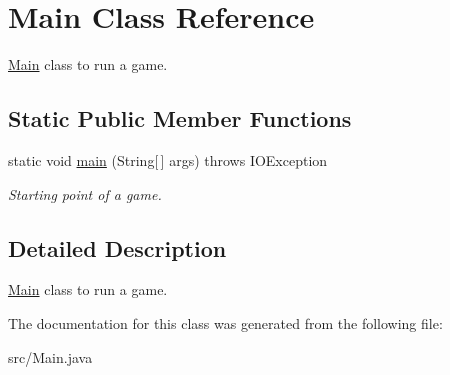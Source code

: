 \hypertarget{classMain}{}\section{Main Class Reference}
\label{classMain}


\hyperlink{classMain}{Main} class to run a game.  


\subsection*{Static Public Member Functions}
\begin{DoxyCompactItemize}
\item 
static void \hyperlink{classMain_a8a5d0f827edddff706cc0e6740d0579a}{main} (String\mbox{[}$\,$\mbox{]} args)  throws I\+O\+Exception \hypertarget{classMain_a8a5d0f827edddff706cc0e6740d0579a}{}\label{classMain_a8a5d0f827edddff706cc0e6740d0579a}

\begin{DoxyCompactList}\small\item\em Starting point of a game. \end{DoxyCompactList}\end{DoxyCompactItemize}


\subsection{Detailed Description}
\hyperlink{classMain}{Main} class to run a game. 

The documentation for this class was generated from the following file\+:\begin{DoxyCompactItemize}
\item 
src/Main.\+java\end{DoxyCompactItemize}
